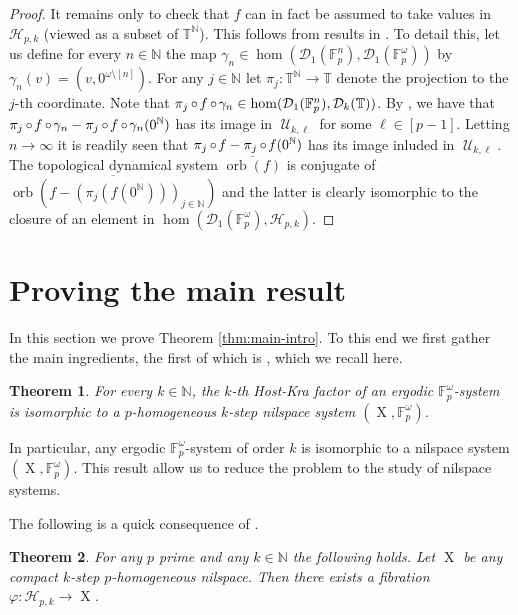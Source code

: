 \documentclass[a4paper,12pt,reqno]{amsart}
\newtheorem{theorem}{Theorem}[section]
\theoremstyle{definition}
\newcommand{\mc}{\mathcal}
\newcommand{\mb}{\mathbb}
\DeclareMathOperator{\ns}{X}
\DeclareMathOperator{\co}{\circ\hspace{-0.02 cm}}
\DeclareMathOperator{\orb}{orb}
\DeclareMathOperator{\abph}{\mc{U}}
\begin{document}
\begin{proof}
It remains only to check that $f$ can in fact be assumed to take values in $\mc{H}_{p,k}$ (viewed as a subset of $\mb{T}^\mb{N}$).
This follows from results in \cite{CGSS-aff-ex}. To detail this, let us define for every $n\in \mb{N}$ the map $\gamma_n\in \hom(\mc{D}_1(\mb{F}_p^n),\mc{D}_1(\mb{F}_p^\omega))$ by $\gamma_n(v)=(v,0^{\omega\setminus[n]})$. For any $j\in \mb{N}$ let $\pi_j:\mb{T}^\mb{N}\to \mb{T}$ denote the projection to the $j$-th coordinate. Note that $\pi_j\co f\co \gamma_n\in \hom(\mc{D}_1(\mb{F}_p^n),\mc{D}_k(\mb{T}))$. By \cite[Proposition E.3]{CGSS-aff-ex}, we have that $\pi_j\co f\co \gamma_n-\pi_j\co f\co \gamma_n(0^{\mb{N}})$ has its image in $\abph_{k,\ell}$ for some $\ell\in[p-1]$. Letting $n\to \infty$ it is readily seen that $\pi_j\co f-\pi_j\co f(0^\mb{N})$ has its image inluded in $\abph_{k,\ell}$. The topological dynamical system $\overline{\orb(f)}$ is conjugate of $\overline{\orb(f-(\pi_j(f(0^\mb{N})))_{j\in \mb{N}})}$ and the latter is clearly isomorphic to the closure of an element in $\hom(\mc{D}_1(\mb{F}_p^\omega),\mc{H}_{p,k})$.
\end{proof}

\section{Proving the main result}\label{sec:mainproof}
\noindent In this section we prove Theorem \ref{thm:main-intro}. To this end we first gather the main ingredients, the first of which is \cite[Theorem 1.9]{CGSS-p-hom}, which we recall here.

\begin{theorem}\label{thm:erg-factors-as-nilspace-sys}
For every $k\in  \mb{N}$, the $k$-th Host-Kra factor of an ergodic $\mb{F}_p^\omega$-system is isomorphic to a $p$-homogeneous $k$-step nilspace system $(\ns,\mb{F}_p^\omega)$.
\end{theorem}
\noindent In particular, any ergodic $\mb{F}_p^\omega$-system of order $k$ is isomorphic to a nilspace system $(\ns,\mb{F}_p^\omega)$. This result allow us to reduce the problem to the study of nilspace systems. 

The following is a quick  consequence of \cite[Theorem 4.3]{CGSS-aff-ex}.

\begin{theorem}\label{thm:covering}
For any $p$ prime and any $k\in \mb{N}$ the following holds. Let $\ns$ be any compact $k$-step $p$-homogeneous nilspace. Then there exists a fibration $\varphi:\mc{H}_{p,k}\to \ns$.
\end{theorem}
\end{document}
